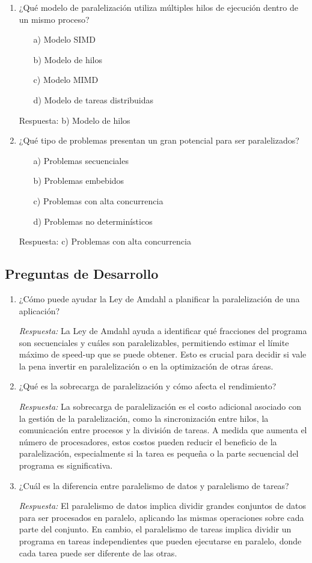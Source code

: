 \documentclass[12pt,a4paper]{article}
\begin{document}
\begin{enumerate}
		\item ¿Qué modelo de paralelización utiliza múltiples hilos de ejecución dentro de un mismo proceso?
		\begin{itemize}
			\item[a)] Modelo SIMD
			\item[b)] Modelo de hilos
			\item[c)] Modelo MIMD
			\item[d)] Modelo de tareas distribuidas
		\end{itemize}
		Respuesta: b) Modelo de hilos
		
		\item ¿Qué tipo de problemas presentan un gran potencial para ser paralelizados?
		\begin{itemize}
			\item[a)] Problemas secuenciales
			\item[b)] Problemas embebidos
			\item[c)] Problemas con alta concurrencia
			\item[d)] Problemas no determinísticos
		\end{itemize}
		Respuesta: c) Problemas con alta concurrencia
	\end{enumerate}
	
	\subsection{Preguntas de Desarrollo}
	\begin{enumerate}
		\item ¿Cómo puede ayudar la Ley de Amdahl a planificar la paralelización de una aplicación?
		
		\textit{Respuesta:} La Ley de Amdahl ayuda a identificar qué fracciones del programa son secuenciales y cuáles son paralelizables, permitiendo estimar el límite máximo de speed-up que se puede obtener. Esto es crucial para decidir si vale la pena invertir en paralelización o en la optimización de otras áreas.
		
		\item ¿Qué es la sobrecarga de paralelización y cómo afecta el rendimiento?
		
		\textit{Respuesta:} La sobrecarga de paralelización es el costo adicional asociado con la gestión de la paralelización, como la sincronización entre hilos, la comunicación entre procesos y la división de tareas. A medida que aumenta el número de procesadores, estos costos pueden reducir el beneficio de la paralelización, especialmente si la tarea es pequeña o la parte secuencial del programa es significativa.
		
		\item ¿Cuál es la diferencia entre paralelismo de datos y paralelismo de tareas?
		
		\textit{Respuesta:} El paralelismo de datos implica dividir grandes conjuntos de datos para ser procesados en paralelo, aplicando las mismas operaciones sobre cada parte del conjunto. En cambio, el paralelismo de tareas implica dividir un programa en tareas independientes que pueden ejecutarse en paralelo, donde cada tarea puede ser diferente de las otras.
	\end{enumerate}
	
\end{document}
